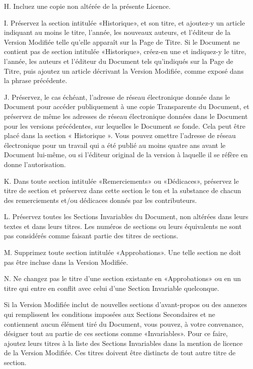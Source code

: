 H. Incluez une copie non altérée de la présente Licence. 

I. Préservez la section intitulée «Historique», et son titre,
et ajoutez-y un article indiquant au moins le titre, l'année, les
nouveaux auteurs, et l'éditeur de la Version Modifiée telle qu'elle
apparaît sur la Page de Titre. Si le Document ne contient pas de section
intitulée «Historique», créez-en une et indiquez-y le titre, l'année,
les auteurs et l'éditeur du Document tels qu'indiqués sur la Page
de Titre, puis ajoutez un article décrivant la Version Modifiée, comme
exposé dans la phrase précédente. 

J. Préservez, le cas échéant, l'adresse de réseau électronique
donnée dans le Document pour accéder publiquement à une copie Transparente
du Document, et préservez de même les adresses de réseau électronique
données dans le Document pour les versions précédentes, sur lequelles
le Document se fonde. Cela peut être placé dans la section « Historique ».
Vous pouvez omettre l'adresse de réseau électronique pour un travail
qui a été publié au moins quatre ans avant le Document lui-même, ou
si l'éditeur original de la version à laquelle il se réfère en donne
l'autorisation. 

K. Dans toute section intitulée «Remerciements» ou «Dédicaces»,
préservez le titre de section et préservez dans cette section le ton
et la substance de chacun des remerciements et/ou dédicaces donnés
par les contributeurs. 

L. Préservez toutes les Sections Invariables du Document,
non altérées dans leurs textes et dans leurs titres. Les numéros de
sections ou leurs équivalents ne sont pas considérés comme faisant
partie des titres de sections. 

M. Supprimez toute section intitulée «Approbations». Une
telle section ne doit pas être incluse dans la Version Modifiée. 

N. Ne changez pas le titre d'une section existante en «Approbations»
ou en un titre qui entre en conflit avec celui d'une Section Invariable
quelconque. 

Si la Version Modifiée inclut de nouvelles sections d'avant-propos
ou des annexes qui remplissent les conditions imposées aux Sections
Secondaires et ne contiennent aucun élément tiré du Document, vous
pouvez, à votre convenance, désigner tout au partie de ces sections
comme «Invariables». Pour ce faire, ajoutez leurs titres à la liste
des Sections Invariables dans la mention de licence de la Version
Modifiée. Ces titres doivent être distincts de tout autre titre de
section. 

